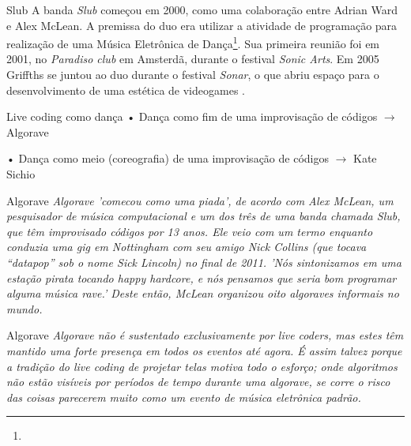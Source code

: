 \documentclass[aspectratio=169]{beamer}
\begin{document}
\begin{frame}{Slub}
A banda \emph{Slub} começou em 2000, como uma colaboração entre Adrian Ward e Alex McLean. A premissa do duo era utilizar a atividade de programação para realização de uma Música Eletrônica de Dança\footnote{}. Sua primeira reunião foi em 2001, no \emph{Paradiso club} em Amsterdã, durante o festival \emph{Sonic Arts}. Em 2005 Griffths se juntou ao duo durante o festival \emph{Sonar}, o que abriu espaço para o desenvolvimento de uma estética de videogames \cite[p.~138--140]{McLean2011}.
\end{frame}

\begin{frame}{Live coding como dança}
• Dança como fim de uma improvisação de códigos $\rightarrow$ Algorave 

• Dança como meio (coreografia) de uma improvisação de códigos $\rightarrow$ Kate Sichio 
\end{frame}

\begin{frame}{Algorave}
\emph{\emph{Algorave} 'comecou como uma piada', de acordo com Alex McLean, um pesquisador de música computacional e um dos três de uma banda chamada \emph{Slub}, que têm improvisado códigos por 13 anos. Ele veio com um termo enquanto conduzia uma \emph{gig} em Nottingham com seu amigo Nick Collins (que tocava ``datapop'' sob o nome Sick Lincoln) no final de 2011. 'Nós sintonizamos em uma estação pirata tocando \emph{happy hardcore}, e nós pensamos que seria bom programar alguma música \emph{rave}.' Deste então, McLean organizou oito \emph{algoraves} informais no mundo.} \cite{chesire_algorave_2013}
\end{frame}

\begin{frame}{Algorave}
\emph{\emph{Algorave} não é sustentado exclusivamente por \emph{live coders}, mas estes têm mantido uma forte presença em todos os eventos até agora. É assim talvez porque a tradição do \emph{live coding} de projetar telas motiva todo o esforço; onde algoritmos não estão visíveis por períodos de tempo durante uma \emph{algorave}, se corre o risco das coisas parecerem muito como um evento de música eletrônica padrão.} \cite[p.~356]{collins_algorave_2014}
\end{frame}
\end{document}
